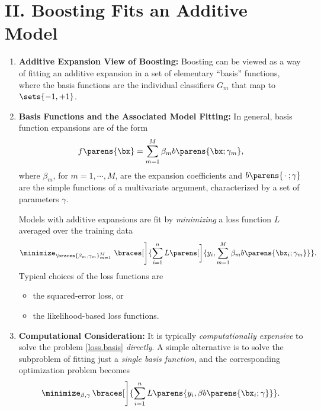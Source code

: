 \documentclass[12pt]{article}
\begin{document}
\section*{II. Boosting Fits an Additive Model}

\begin{enumerate}[label=\textbf{\arabic*.}]

	\item \textbf{Additive Expansion View of Boosting:} Boosting can be viewed as a way of fitting an additive expansion in a set of elementary ``basis'' functions, where the basis functions are the individual classifiers $G_m$ that map to $\sets{-1, +1}$. 
	
	\item \textbf{Basis Functions and the Associated Model Fitting:} In general, basis function expansions are of the form 
	\begin{align*}
		f \parens{\bx} = \sum_{m=1}^M \beta_m b \parens{\bx; \gamma_m}, 
	\end{align*}
	where $\beta_m$, for $m = 1, \cdots, M$, are the expansion coefficients and $b \parens{\,\cdot\,; \gamma}$ are the simple functions of a multivariate argument, characterized by a set of parameters $\gamma$. 
	
	Models with additive expansions are fit by \emph{minimizing} a loss function $L$ averaged over the training data
	\begin{align}\label{loss.basis}
		\minimize_{\braces{\beta_m, \gamma_m}_{m=1}^M} \ \braces[\Bigg]{\sum_{i=1}^n L \parens[\bigg]{y_i, \sum_{m=1}^M \beta_m b \parens{\bx_i; \gamma_m}}}. 
	\end{align}
	Typical choices of the loss functions are 
	\begin{itemize}
		\item the squared-error loss, or 
		\item the likelihood-based loss functions. 
	\end{itemize}
	
	\item \textbf{Computational Consideration:} It is typically \emph{computationally expensive} to solve the problem \eqref{loss.basis} \emph{directly}. A simple alternative is to solve the subproblem of fitting just a \emph{single basis function}, and the corresponding optimization problem becomes 
	\begin{align*}
		\minimize_{\beta, \gamma} \, \braces[\Bigg]{\sum_{i=1}^n L \parens{y_i, \beta b \parens{\bx_i; \gamma}}}. 
	\end{align*}

\end{enumerate}
\end{document}
